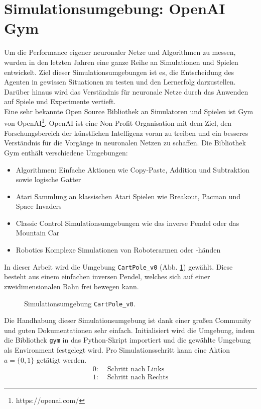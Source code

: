 \section{Simulationsumgebung: OpenAI Gym}
\label{sec:imp_sim}
	Um die Performance eigener neuronaler Netze und Algorithmen zu messen, wurden in den letzten Jahren eine ganze Reihe an Simulationen und Spielen entwickelt. Ziel dieser Simulationsumgebungen ist es, die Entscheidung des Agenten in gewissen Situationen zu testen und den Lernerfolg darzustellen. Darüber hinaus wird das Verständnis für neuronale Netze durch das Anwenden auf Spiele und Experimente vertieft.\\
	Eine sehr bekannte Open Source Bibliothek an Simulatoren und Spielen ist Gym von OpenAI\footnote{https://openai.com/}. OpenAI ist eine Non-Profit Organisation mit dem Ziel, den Forschungsbereich der künstlichen Intelligenz voran zu treiben und ein besseres Verständnis für die Vorgänge in neuronalen Netzen zu schaffen. Die Bibliothek Gym enthält verschiedene Umgebungen:
	\begin{itemize}
		\item Algorithmen:
		\subitem Einfache Aktionen wie Copy-Paste, Addition und Subtraktion sowie logische Gatter
		\item Atari
		\subitem Sammlung an klassischen Atari Spielen wie Breakout, Pacman und Space Invaders
		\item Classic Control
		\subitem Simulationsumgebungen wie das inverse Pendel oder das Mountain Car
		\item Robotics
		\subitem Komplexe Simulationen von Roboterarmen oder -händen
	\end{itemize}
	In dieser Arbeit wird die Umgebung \texttt{CartPole\_v0} (Abb. \ref{fig:imp_cartpole}) gewählt. Diese besteht aus einem einfachen inversen Pendel, welches sich auf einer zweidimensionalen Bahn frei bewegen kann.
	\begin{figure}[!h] %
		\centering
		\def\svgwidth{12cm}
		
		\caption{Simulationsumgebung \texttt{CartPole\_v0}.}
		\label{fig:imp_cartpole}
	\end{figure}
	Die Handhabung dieser Simulationsumgebung ist dank einer großen Community und guten Dokumentationen sehr einfach. Initialisiert wird die Umgebung, indem die Bibliothek \texttt{gym} in das Python-Skript importiert und die gewählte Umgebung als \glqq Environment \grqq{}festgelegt wird. Pro Simulationsschritt kann eine Aktion $a = \{0,1\}$ getätigt werden.
	\begin{align*}
		0 :& \text{ Schritt nach Links}\\
		1 :& \text{ Schritt nach Rechts}
	\end{align*}
